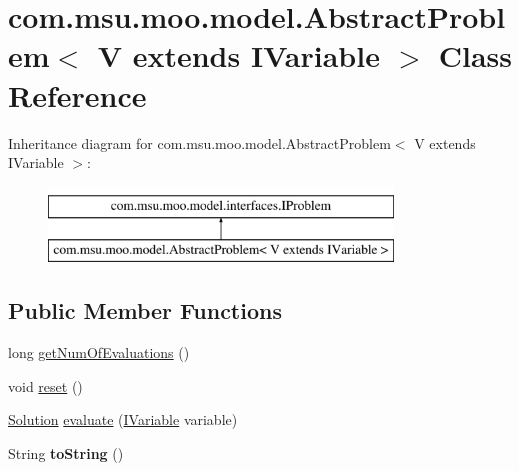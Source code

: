 \hypertarget{classcom_1_1msu_1_1moo_1_1model_1_1AbstractProblem_3_01V_01extends_01IVariable_01_4}{\section{com.\-msu.\-moo.\-model.\-Abstract\-Problem$<$ V extends I\-Variable $>$ Class Reference}
\label{classcom_1_1msu_1_1moo_1_1model_1_1AbstractProblem_3_01V_01extends_01IVariable_01_4}
}
Inheritance diagram for com.\-msu.\-moo.\-model.\-Abstract\-Problem$<$ V extends I\-Variable $>$\-:\begin{figure}[H]
\begin{center}
\leavevmode
\includegraphics[height=2.000000cm]{classcom_1_1msu_1_1moo_1_1model_1_1AbstractProblem_3_01V_01extends_01IVariable_01_4}
\end{center}
\end{figure}
\subsection*{Public Member Functions}
\begin{DoxyCompactItemize}
\item 
long \hyperlink{classcom_1_1msu_1_1moo_1_1model_1_1AbstractProblem_3_01V_01extends_01IVariable_01_4_a6d774087779671d0478dcc5beb25c7b9}{get\-Num\-Of\-Evaluations} ()
\item 
void \hyperlink{classcom_1_1msu_1_1moo_1_1model_1_1AbstractProblem_3_01V_01extends_01IVariable_01_4_ae3d2d54f9ada94985968dc96a03d22df}{reset} ()
\item 
\hyperlink{classcom_1_1msu_1_1moo_1_1model_1_1solution_1_1Solution}{Solution} \hyperlink{classcom_1_1msu_1_1moo_1_1model_1_1AbstractProblem_3_01V_01extends_01IVariable_01_4_a9ed0a86fb3bb92cda13cd331013dcc00}{evaluate} (\hyperlink{interfacecom_1_1msu_1_1moo_1_1model_1_1interfaces_1_1IVariable}{I\-Variable} variable)
\item 
\hypertarget{classcom_1_1msu_1_1moo_1_1model_1_1AbstractProblem_3_01V_01extends_01IVariable_01_4_a5574c3ea3a28a568915c01ca05e8f01d}{String {\bfseries to\-String} ()}\label{classcom_1_1msu_1_1moo_1_1model_1_1AbstractProblem_3_01V_01extends_01IVariable_01_4_a5574c3ea3a28a568915c01ca05e8f01d}

\end{DoxyCompactItemize}
